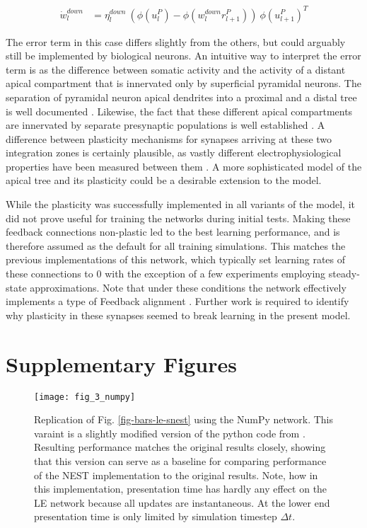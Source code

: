 \begin{align}
  \dot{w}_{l}^{down} & = \eta_l^{down} \ ( \phi(u_l^{P}) - \phi(w_l^{down} r_{l+1}^P) )\ \phi(u_{l+1}^{P})^T
\end{align}

The error term in this case differs slightly from the others, but could arguably still be implemented by biological
neurons. An intuitive way to interpret the error term is as the difference between somatic activity and the activity of
a distant apical compartment that is innervated only by superficial pyramidal neurons. The separation of pyramidal
neuron apical dendrites into a proximal and a distal tree is well documented \citep{Ishizuka1995}. Likewise, the fact
that these different apical compartments are innervated by separate presynaptic populations is well established
\citep{Larkum2018}. A difference between plasticity mechanisms for synapses arriving at these two integration zones is
certainly plausible, as vastly different electrophysiological properties have been measured between them
\citep{Ishizuka1995,Larkum2022}. A more sophisticated model of the apical tree and its plasticity could be a desirable
extension to the model.

While the plasticity was successfully implemented in all variants of the model, it did not prove useful for training the
networks during initial tests. Making these feedback connections non-plastic led to the best learning performance, and
is therefore assumed as the default for all training simulations. This matches the previous implementations of this
network, which typically set learning rates of these connections to $0$ with the exception of a few experiments
employing steady-state approximations. Note that under these conditions the network effectively implements a type of
Feedback alignment \citep{Lillicrap2014}. Further work is required to identify why plasticity in these synapses seemed
to break learning in the present model.

\newpage
\section{Supplementary Figures}


\renewcommand{\thefigure}{S\arabic{figure}}
\begin{figure}[h!]
  \centering
  \texttt{[image: fig\_3\_numpy]}
  \caption[Replication of Fig. \ref{fig-bars-le-snest} using the NumPy network]{Replication of Fig.
    \ref{fig-bars-le-snest} using the NumPy network. This varaint is a slightly modified version of the python code from
    \citep{Haider2021}. Resulting performance matches the original results closely, showing that this version can serve
    as a baseline for comparing performance of the NEST implementation to the original results. Note, how in this
    implementation, presentation time has hardly any effect on the LE network because all updates are instantaneous. At
    the lower end presentation time is only limited by simulation timestep $\Delta t$.}
  \label{fig-bars-le-numpy}
\end{figure}


